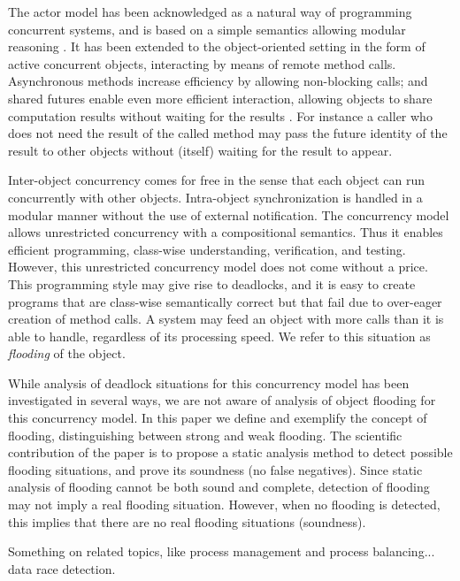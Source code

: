 \documentclass[12pt]{article}%
\begin{document}
The actor model has been acknowledged as a natural way of programming
concurrent systems, and is based on a simple semantics allowing
modular reasoning \cite{Hewitt77,Agha86,DAghaT04,218170}.  It has been
extended to the object-oriented setting in the form of active
concurrent objects, interacting by means of remote method calls.
Asynchronous methods increase efficiency by allowing non-blocking calls;
and shared futures enable even more efficient interaction, allowing
objects to share computation results without waiting for the results
\cite{Yonezawa86,Halstead85,liskov88pldi}. For instance a caller who
does not need the result of the called method may pass the future
identity of the result to other objects without (itself) waiting for the
result to appear.

Inter-object concurrency comes for free in the sense that each object
can run concurrently with other objects.  Intra-object synchronization
is handled in a modular manner without the use of external notification.
The concurrency model allows unrestricted concurrency with a
compositional semantics. Thus it enables %
efficient programming, class-wise understanding, verification, and testing.
However, this unrestricted concurrency model
does not come without a price.  This
programming style may give rise to deadlocks, and it is easy
to create programs that are class-wise semantically
correct but that fail due to over-eager creation of %
method calls. A system may feed an object with more calls than it is
able to handle, regardless of its processing speed.  We refer to this
situation as \emph{flooding} of the object.

While analysis of deadlock situations for this concurrency model has
been investigated in several ways, we are not aware of analysis of
object flooding for this concurrency model. In this paper we define
and exemplify the concept of flooding, distinguishing between strong
and weak flooding.  The scientific contribution of the paper is to
propose a static analysis method to detect possible flooding
situations, and prove its soundness (no false negatives).  Since 
static analysis of flooding cannot be both sound and complete,
detection of flooding may not imply a real flooding situation.
However, when no flooding is detected, this
 implies that there are no real flooding situations (soundness).

Something on related topics, like process management and process balancing...
data race detection.
\end{document}
